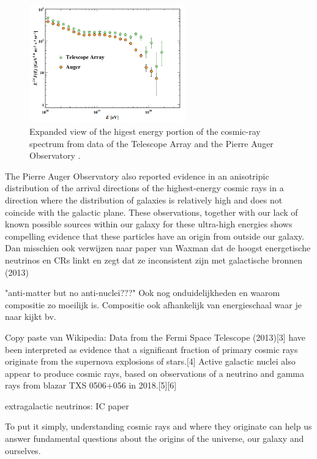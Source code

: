 \begin{figure}
\label{fig:ankle}
\centering
\includegraphics[width=0.6\textwidth]{chapter3/img/ankle.png}
\caption{Expanded view of the higest energy portion of the cosmic-ray spectrum from data of the Telescope Array and the Pierre Auger Observatory \cite{pdg2018}.}
\end{figure}
The Pierre Auger Observatory also reported evidence in an anisotripic distribution of the arrival directions of the highest-energy cosmic rays \cite{Aab:2017tyv} in a direction where the distribution of galaxies is relatively high and does not coincide with the galactic plane. These observations, together with our lack of known possible sources within our galaxy for these ultra-high energies shows compelling evidence that these particles have an origin from outside our galaxy. Dan misschien ook verwijzen naar paper van Waxman dat de hoogst energetische neutrinos en CRs linkt en zegt dat ze inconsistent zijn met galactische bronnen (2013)




"anti-matter but no anti-nuclei???"
Ook nog onduidelijkheden en waarom compositie zo moeilijk is. Compositie ook afhankelijk van energieschaal waar je naar kijkt bv.

Copy paste van Wikipedia:
 Data from the Fermi Space Telescope (2013)[3] have been interpreted as evidence that a significant fraction of primary cosmic rays originate from the supernova explosions of stars.[4] Active galactic nuclei also appear to produce cosmic rays, based on observations of a neutrino and gamma rays from blazar TXS 0506+056 in 2018.[5][6]



extragalactic neutrinos: IC paper


To put it simply, understanding cosmic rays and where they originate can help us answer fundamental questions about the origins of the universe, our galaxy and ourselves.
